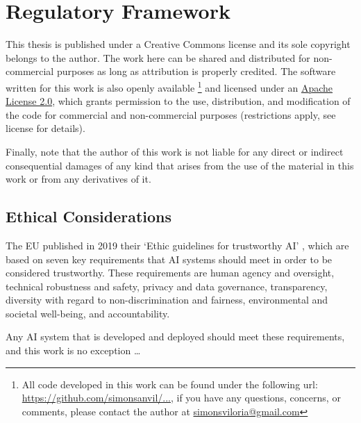 \documentclass[../main.tex]{subfiles}
\begin{document}
\chapter*{Regulatory Framework} \label{chap:regulatory_framework}

This thesis is published under a Creative Commons license and its sole copyright belongs to the author. The work here can be shared and distributed for non-commercial purposes as long as attribution is properly credited. 
The software written for this work is also openly available
\footnote{All code developed in this work can be found under the following url: \href{}{https://github.com/simonsanvil/...}, if you have any questions, concerns, or comments, please contact the author at \href{mailto:simonsviloria@gmail.com}{simonsviloria@gmail.com}
} 
and licensed under an \href{https://en.wikipedia.org/wiki/Apache_License}{Apache License 2.0}, which grants permission to the use, distribution, and modification of the code for commercial and non-commercial purposes (restrictions apply, see license for details). \\


Finally, note that the author of this work is not liable for any direct or indirect consequential damages of any kind that arises from the use of the material in this work or from any derivatives of it.

\section*{Ethical Considerations}  \label{ethics}

The EU published in 2019 their `Ethic guidelines for trustworthy AI' \cite{noauthor_ethics_2019}, which are based on seven key requirements that AI systems should meet in order to be considered trustworthy. These requirements are human agency and oversight, technical robustness and safety, privacy and data governance, transparency, diversity with regard to non-discrimination and fairness, environmental and societal well-being, and accountability. 

Any AI system that is developed and deployed should meet these requirements, and this work is no exception \dots
\end{document}
